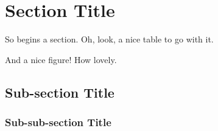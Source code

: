
\section{Section Title}
\label{sec:section1}
So begins a section. Oh, look, a nice table to go with it.



And a nice figure! How lovely.



\subsection{Sub-section Title}
\label{sec:sub}

\subsubsection{Sub-sub-section Title}
\label{sec:subsub}


